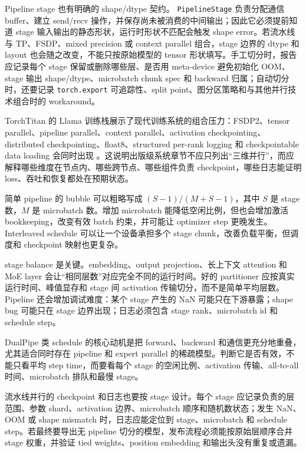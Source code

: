 \documentclass[UTF8,zihao=-4,openany]{ctexbook}
\begin{document}
Pipeline stage 也有明确的 shape/dtype 契约。 \texttt{PipelineStage} 负责分配通信 buffer、建立 send/recv 操作，并保存尚未被消费的中间输出；因此它必须提前知道 stage 输入输出的静态形状，运行时形状不匹配会触发 shape error。若流水线与 TP、FSDP、mixed precision 或 context parallel 组合，stage 边界的 dtype 和 layout 也会随之改变，不能只按原始模型的 tensor 形状填写。手工切分时，报告应记录每个 stage 保留或删除哪些层、是否用 meta-device 避免初始化 OOM、stage 输出 shape/dtype、microbatch chunk spec 和 backward 归属；自动切分时，还要记录 \texttt{torch.export} 可追踪性、split point、图分区策略和与其他并行技术组合时的 workaround。

TorchTitan 的 Llama 训练栈展示了现代训练系统的组合压力：FSDP2、tensor parallel、pipeline parallel、context parallel、activation checkpointing、distributed checkpointing、float8、structured per-rank logging 和 checkpointable data loading 会同时出现 \cite{pytorch2026torchtitan}。这说明出版级系统章节不应只列出“三维并行”，而应解释哪些维度在节点内、哪些跨节点、哪些组件负责 checkpoint，哪些日志能证明 loss、吞吐和恢复都处在预期状态。

简单 pipeline 的 bubble 可以粗略写成 $(S-1)/(M+S-1)$，其中 $S$ 是 stage 数，$M$ 是 microbatch 数。增加 microbatch 能降低空闲比例，但也会增加激活 bookkeeping，改变有效 batch 约束，并可能让 optimizer step 更晚发生。Interleaved schedule 可以让一个设备承担多个 stage chunk，改善负载平衡，但调度和 checkpoint 映射也更复杂。

stage balance 是关键。embedding、output projection、长上下文 attention 和 MoE layer 会让“相同层数”对应完全不同的运行时间。好的 partitioner 应按真实运行时间、峰值显存和 stage 间 activation 传输切分，而不是简单平均层数。Pipeline 还会增加调试难度：某个 stage 产生的 NaN 可能只在下游暴露；shape bug 可能只在 stage 边界出现；日志必须包含 stage rank、microbatch id 和 schedule step。

DualPipe 类 schedule 的核心动机是把 forward、backward 和通信更充分地重叠，尤其适合同时存在 pipeline 和 expert parallel 的稀疏模型。判断它是否有效，不能只看平均 step time，而要看每个 stage 的空闲比例、activation 传输、all-to-all 时间、microbatch 排队和最慢 stage。

流水线并行的 checkpoint 和日志也要按 stage 设计。每个 stage 应记录负责的层范围、参数 shard、activation 边界、microbatch 顺序和随机数状态；发生 NaN、OOM 或 shape mismatch 时，日志应能定位到 stage、microbatch 和 schedule step。若最终要导出无 pipeline 切分的模型，发布流程必须能按原始层顺序合并 stage 权重，并验证 tied weights、position embedding 和输出头没有重复或遗漏。
\end{document}
